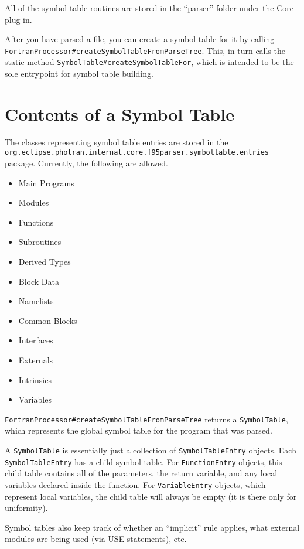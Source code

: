 
All of the symbol table routines are stored in the ``parser'' folder under the
Core plug-in.

After you have parsed a file, you can create a symbol table for it by calling
\texttt{FortranProcessor\#createSymbolTableFromParseTree}.  This, in turn calls
the static method \texttt{SymbolTable\#createSymbolTableFor}, which is intended
to be the sole entrypoint for symbol table building.

\section{Contents of a Symbol Table}

The classes representing symbol table entries are stored in the
\texttt{org.eclipse.photran.internal.core.f95parser.symboltable.entries}
package.  Currently, the following are allowed.
\begin{itemize}
\item Main Programs
\item Modules
\item Functions
\item Subroutines
\item Derived Types
\item Block Data
\item Namelists
\item Common Blocks
\item Interfaces
\item Externals
\item Intrinsics
\item Variables
\end{itemize}

\texttt{FortranProcessor\#createSymbolTableFromParseTree} returns a
\texttt{SymbolTable}, which represents the global symbol table for
the program that was parsed.

A \texttt{SymbolTable} is essentially just a collection of
\texttt{SymbolTableEntry} objects.  Each \texttt{SymbolTableEntry} has
a child symbol table.  For \texttt{FunctionEntry} objects, this child
table contains all of the parameters, the return variable, and any
local variables declared inside the function.  For \texttt{VariableEntry}
objects, which represent local variables, the child table will always
be empty (it is there only for uniformity).

Symbol tables also keep track of whether an ``implicit'' rule applies,
what external modules are being used (via USE statements), etc.

